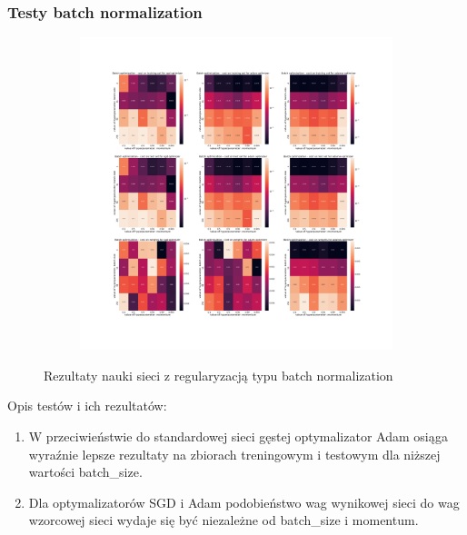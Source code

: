 \documentclass[12pt]{article}
\begin{document}
\subsubsection{Testy batch normalization}
\begin{figure}[h!]
	\centering
	\begin{subfigure}[b]{1\linewidth}
		\includegraphics[width=\linewidth]{Comparision_batch_norm_conv_2.png}
	\end{subfigure}
	\label{fig:batch_cnn}
	\caption{Rezultaty nauki sieci z regularyzacją typu batch normalization}
\end{figure}
Opis testów i ich rezultatów:
\begin{enumerate}
	\item W przeciwieństwie do standardowej sieci gęstej optymalizator Adam osiąga wyraźnie lepsze rezultaty na zbiorach treningowym i testowym dla niższej wartości batch\_size.
	\item Dla optymalizatorów SGD i Adam podobieństwo wag wynikowej sieci do wag wzorcowej sieci wydaje się być niezależne od batch\_size i momentum.
\end{enumerate}
\end{document}
